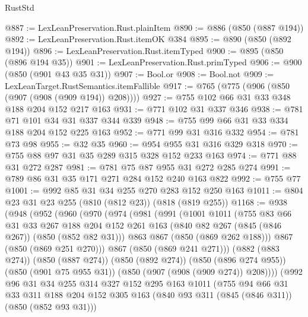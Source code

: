 \begin{lexlean}{RustStd}
\begin{coremodule}
@887 := LexLeanPreservation.Rust.plainItem
@890 := @886 (@850 (@887 @194))
@892 := LexLeanPreservation.Rust.itemOK @384
@895 := @890 (@850 (@892 @194))
@896 := LexLeanPreservation.Rust.itemTyped
@900 := @895 (@850 (@896 @194 @35))
@901 := LexLeanPreservation.Rust.primTyped
@906 := @900 (@850 (@901 @43 @35 @31))
@907 := Bool.or
@908 := Bool.not
@909 := LexLeanTarget.RustSemantics.itemFallible
@917 := @765 (@775 (@906 (@850 (@907 (@908 (@909 @194)) @208))))
@927 := @755 @102 @66 @31 @33 @348 @188 @204 @152 @217 @163
@931 := @771 @102 @31 @337 @346
@938 := @781 @71 @101 @34 @31 @337 @344 @339
@948 := @755 @99 @66 @31 @33 @334 @188 @204 @152 @225 @163
@952 := @771 @99 @31 @316 @332
@954 := @781 @73 @98
@955 := @32 @35
@960 := @954 @955 @31 @316 @329 @318
@970 := @755 @88 @97 @31 @35 @289 @315 @328 @152 @233 @163
@974 := @771 @88 @31 @272 @287
@981 := @781 @75 @87 @955 @31 @272 @285 @274
@991 := @789 @86 @31 @35 @171 @271 @284 @152 @240 @163 @822
@992 := @755 @77
@1001 := @992 @85 @31 @34 @255 @270 @283 @152 @250 @163
@1011 := @804 @23 @31 @23 @255 (@810 (@812 @23)) (@818 (@819 @255))
@1168 := @938
    (@948
      (@952
        (@960
          (@970
            (@974
              (@981
                (@991
                  (@1001
                    @1011
                    (@755
                      @83
                      @66
                      @31
                      @33
                      @267
                      @188
                      @204
                      @152
                      @261
                      @163
                      (@840 @82 @267 (@845 (@846 @267)) (@850 (@852 @82 @31)))
                      @863
                      @867
                      (@850 (@869 @262 @188)))
                    @867
                    (@850 (@869 @251 @270)))
                  @867
                  (@850 (@869 @241 @271)))
                (@882 (@883 @274))
                (@850 (@887 @274))
                (@850 (@892 @274))
                (@850 (@896 @274 @955))
                (@850 (@901 @75 @955 @31))
                (@850 (@907 (@908 (@909 @274)) @208))))
            (@992
              @96
              @31
              @34
              @255
              @314
              @327
              @152
              @295
              @163
              @1011
              (@755
                @94
                @66
                @31
                @33
                @311
                @188
                @204
                @152
                @305
                @163
                (@840 @93 @311 (@845 (@846 @311)) (@850 (@852 @93 @31)))

\end{coremodule}
\end{lexlean}
